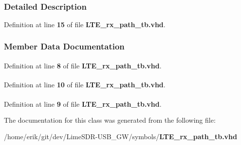 \subsubsection{Detailed Description}


Definition at line {\bf 15} of file {\bf L\+T\+E\+\_\+rx\+\_\+path\+\_\+tb.\+vhd}.



\subsubsection{Member Data Documentation}
\paragraph[{ieee}]{\hspace{0.3cm}{\ttfamily [Library]}}\label{classLTE__rx__path__tb_a0a6af6eef40212dbaf130d57ce711256}


Definition at line {\bf 8} of file {\bf L\+T\+E\+\_\+rx\+\_\+path\+\_\+tb.\+vhd}.

\paragraph[{numeric\+\_\+std}]{\hspace{0.3cm}{\ttfamily [Package]}}\label{classLTE__rx__path__tb_a2edc34402b573437d5f25fa90ba4013e}


Definition at line {\bf 10} of file {\bf L\+T\+E\+\_\+rx\+\_\+path\+\_\+tb.\+vhd}.

\paragraph[{std\+\_\+logic\+\_\+1164}]{\hspace{0.3cm}{\ttfamily [Package]}}\label{classLTE__rx__path__tb_acd03516902501cd1c7296a98e22c6fcb}


Definition at line {\bf 9} of file {\bf L\+T\+E\+\_\+rx\+\_\+path\+\_\+tb.\+vhd}.



The documentation for this class was generated from the following file\+:\begin{DoxyCompactItemize}
\item 
/home/erik/git/dev/\+Lime\+S\+D\+R-\/\+U\+S\+B\+\_\+\+G\+W/symbols/{\bf L\+T\+E\+\_\+rx\+\_\+path\+\_\+tb.\+vhd}\end{DoxyCompactItemize}
